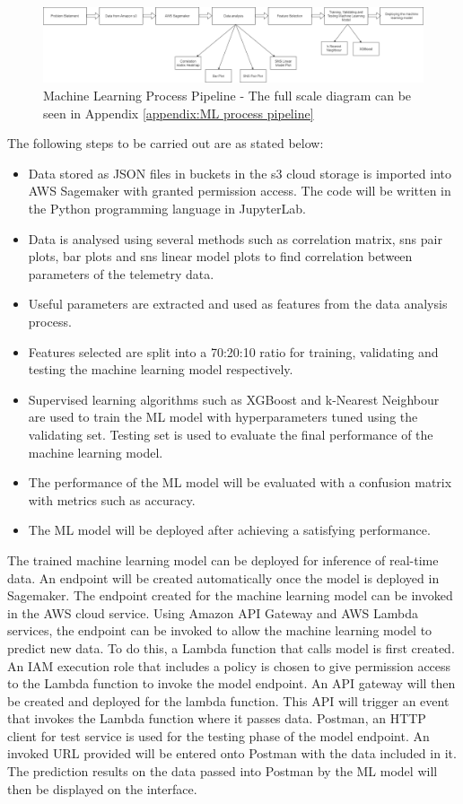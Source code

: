 \begin{figure}[ht]
    \centering
    \includegraphics[width=1\linewidth]{pages/Chapter3/Chapter 3 images/Ml.PNG}
    \caption{Machine Learning Process Pipeline - The full scale diagram can be seen in Appendix \ref{appendix:ML process pipeline}}
    \label{Machine Learning Process Pipeline}
\end{figure}

The following steps to be carried out are as stated below:
\begin{itemize}
    \item Data stored as JSON files in buckets in the s3 cloud storage is imported into AWS Sagemaker with granted permission access. The code will be written in the Python programming language in JupyterLab. 
    \item Data is analysed using several methods such as correlation matrix, sns pair plots, bar plots and sns linear model plots to find correlation between parameters of the telemetry data.
    \item Useful parameters are extracted and used as features from the data analysis process. 
    \item Features selected are split into a 70:20:10 ratio for training, validating and testing the machine learning model respectively.
    \item Supervised learning algorithms such as XGBoost and k-Nearest Neighbour are used to train the ML model with hyperparameters tuned using the validating set. Testing set is used to evaluate the final performance of the machine learning model.
     \item The performance of the ML model will be evaluated with a confusion matrix with metrics such as accuracy.
    \item The ML model will be deployed after achieving a satisfying performance.
\end{itemize}

The trained machine learning model can be deployed for inference of real-time data. An endpoint will be created automatically once the model is deployed in Sagemaker. The endpoint created for the machine learning model can be invoked in the AWS cloud service.
Using Amazon API Gateway and AWS Lambda services, the endpoint can be invoked to allow the machine learning model to predict new data. To do this, a Lambda function that calls model is first created. An IAM execution role that includes a policy is chosen to give permission access to the Lambda function to invoke the model endpoint. An API gateway will then be created and deployed for the lambda function. This API will trigger an event that invokes the Lambda function where it passes data. Postman, an HTTP client for test service is used for the testing phase of the model endpoint. An invoked URL provided will be entered onto Postman with the data included in it. The prediction results on the data passed into Postman by the ML model will then be displayed on the interface. 


